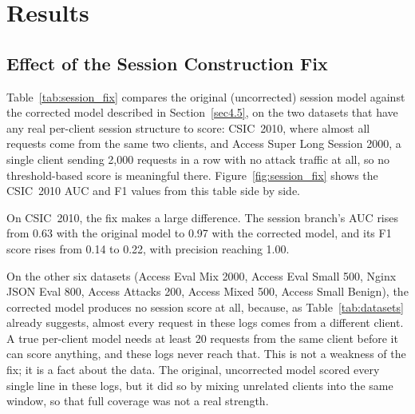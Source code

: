 \documentclass[futureinternet,article,submit,moreauthors]{Definitions/mdpi}
\begin{document}
\section{Results} \label{sec5}

\subsection{Effect of the Session Construction Fix}

Table~\ref{tab:session_fix} compares the original (uncorrected) session model against the corrected model described in Section~\ref{sec4.5}, on the two datasets that have any real per-client session structure to score: CSIC~2010, where almost all requests come from the same two clients, and Access Super Long Session 2000, a single client sending 2{,}000 requests in a row with no attack traffic at all, so no threshold-based score is meaningful there. Figure~\ref{fig:session_fix} shows the CSIC~2010 AUC and F1 values from this table side by side.

On CSIC~2010, the fix makes a large difference. The session branch's AUC rises from 0.63 with the original model to 0.97 with the corrected model, and its F1 score rises from 0.14 to 0.22, with precision reaching 1.00.

On the other six datasets (Access Eval Mix 2000, Access Eval Small 500, Nginx JSON Eval 800, Access Attacks 200, Access Mixed 500, Access Small Benign), the corrected model produces no session score at all, because, as Table~\ref{tab:datasets} already suggests, almost every request in these logs comes from a different client. A true per-client model needs at least 20 requests from the same client before it can score anything, and these logs never reach that. This is not a weakness of the fix; it is a fact about the data. The original, uncorrected model scored every single line in these logs, but it did so by mixing unrelated clients into the same window, so that full coverage was not a real strength.
\end{document}
